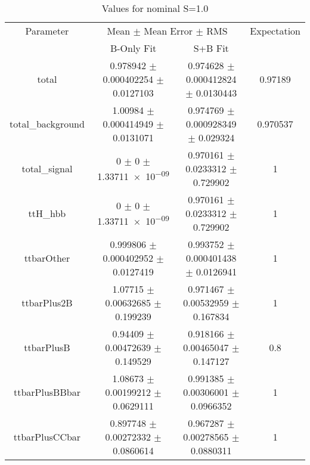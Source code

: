 \begin{table}
\centering
\caption{Values for nominal S=1.0}
\begin{tabular}{cccc}
\toprule
Parameter & \multicolumn{2}{c}{Mean $\pm$ Mean Error $\pm$ RMS} & Expectation\\
 & B-Only Fit & S+B Fit & \\
\midrule
total & \num{0.978942} $\pm$ \num{0.000402254} $\pm$ \num{0.0127103} & \num{0.974628} $\pm$ \num{0.000412824} $\pm$ \num{0.0130443} & \num{0.97189}\\
total\_background & \num{1.00984} $\pm$ \num{0.000414949} $\pm$ \num{0.0131071} & \num{0.974769} $\pm$ \num{0.000928349} $\pm$ \num{0.029324} & \num{0.970537}\\
total\_signal & \num{0} $\pm$ \num{0} $\pm$ \num{1.33711e-09} & \num{0.970161} $\pm$ \num{0.0233312} $\pm$ \num{0.729902} & \num{1}\\
ttH\_hbb & \num{0} $\pm$ \num{0} $\pm$ \num{1.33711e-09} & \num{0.970161} $\pm$ \num{0.0233312} $\pm$ \num{0.729902} & \num{1}\\
ttbarOther & \num{0.999806} $\pm$ \num{0.000402952} $\pm$ \num{0.0127419} & \num{0.993752} $\pm$ \num{0.000401438} $\pm$ \num{0.0126941} & \num{1}\\
ttbarPlus2B & \num{1.07715} $\pm$ \num{0.00632685} $\pm$ \num{0.199239} & \num{0.971467} $\pm$ \num{0.00532959} $\pm$ \num{0.167834} & \num{1}\\
ttbarPlusB & \num{0.94409} $\pm$ \num{0.00472639} $\pm$ \num{0.149529} & \num{0.918166} $\pm$ \num{0.00465047} $\pm$ \num{0.147127} & \num{0.8}\\
ttbarPlusBBbar & \num{1.08673} $\pm$ \num{0.00199212} $\pm$ \num{0.0629111} & \num{0.991385} $\pm$ \num{0.00306001} $\pm$ \num{0.0966352} & \num{1}\\
ttbarPlusCCbar & \num{0.897748} $\pm$ \num{0.00272332} $\pm$ \num{0.0860614} & \num{0.967287} $\pm$ \num{0.00278565} $\pm$ \num{0.0880311} & \num{1}\\
\bottomrule
\end{tabular}
\end{table}